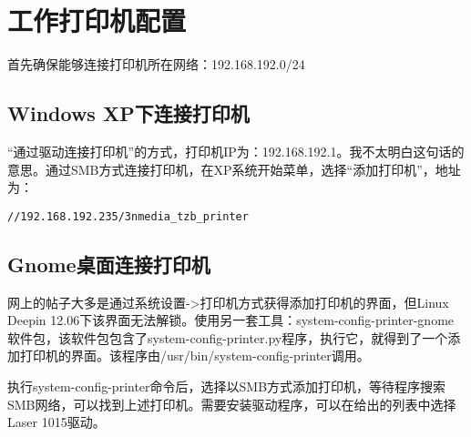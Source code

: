 

\section{工作打印机配置}
首先确保能够连接打印机所在网络：192.168.192.0/24

\subsection{Windows XP下连接打印机}

“通过驱动连接打印机”的方式，打印机IP为：192.168.192.1。我不太明白这句话的意思。通过SMB方式连接打印机，在XP系统开始菜单，选择“添加打印机”，地址为：
\begin{verbatim}
//192.168.192.235/3nmedia_tzb_printer
\end{verbatim}

\subsection{Gnome桌面连接打印机}
网上的帖子大多是通过系统设置->打印机方式获得添加打印机的界面，但Linux Deepin 12.06下该界面无法解锁。使用另一套工具：system-config-printer-gnome软件包，该软件包包含了system-config-printer.py程序，执行它，就得到了一个添加打印机的界面。该程序由/usr/bin/system-config-printer调用。

执行system-config-printer命令后，选择以SMB方式添加打印机，等待程序搜索SMB网络，可以找到上述打印机。需要安装驱动程序，可以在给出的列表中选择Laser 1015驱动。



